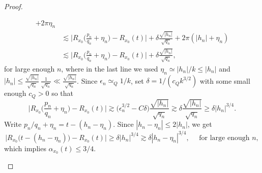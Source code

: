 \documentclass[11pt,reqno]{amsart}
\theoremstyle{definition}
\begin{document}
\begin{proof}
\begin{itemize}
\begin{itemize}
\begin{itemize}
\begin{equation}
\begin{split}
		+ 2\pi \eta_n \\
		& \lesssim \Big|  R_{x_0}\Big( \frac{p_n}{q_n} + \eta_n \Big) - R_{x_0}(t) \Big| 
		+ \delta \frac{\sqrt{|h_n|}}{\sqrt{q_n}} 
		+ 2\pi ( |h_n|  + \eta_n)   \\
		& \lesssim \Big|  R_{x_0}\Big( \frac{p_n}{q_n} + \eta_n \Big) - R_{x_0}(t) \Big| 
		+ \delta \frac{\sqrt{|h_n|}}{\sqrt{q_n}},
		\end{split}
		\end{equation}
	for large enough $n$, 
	where in the last line we used $\eta_n \simeq |h_n|/k \leq |h_n|$
	and $|h_n| \leq  \frac{\sqrt{|h_n|}}{\sqrt{q_n}} \, \frac{1}{\sqrt{q_n}} \ll  \frac{\sqrt{|h_n|}}{\sqrt{q_n}}$. 
	Since $\epsilon_n \simeq_Q 1/k$, set  $\delta = 1/(c_Qk^{3/2})$ with some small enough $c_Q>0$ so that
	\begin{equation}
	\Big|  R_{x_0}\Big( \frac{p_n}{q_n} + \eta_n \Big) - R_{x_0}(t) \Big| 
	\gtrsim \Big(  \epsilon_n^{3/2} - C\delta \Big) \frac{\sqrt{|h_n|}}{\sqrt{q_n}} 
	\gtrsim \delta \frac{\sqrt{|h_n|}}{\sqrt{q_n}} 
	\geq \delta  |h_n|^{3/4}. 
	\end{equation}
	Write $p_n/q_n + \eta_n = t - (h_n -  \eta_n)$. 
	Since $|h_n - \eta_n| \leq 2|h_n|$, 
	we get 
	\begin{equation}
	\Big|  R_{x_0}\Big(  t - (h_n -  \eta_n) \Big) - R_{x_0}(t) \Big| 
	\geq \delta |h_n|^{3/4} 
	\gtrsim \delta |h_n -  \eta_n|^{3/4}, \quad \text{ for large enough } n, 
	\end{equation}
	which implies $\alpha_{x_0}(t) \leq 3/4$. 
		
	\end{itemize}
	

\end{itemize}
\end{itemize}
\end{proof}
\end{document}
